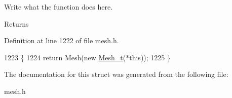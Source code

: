 Write what the function does here. 

\begin{DoxyReturn}{Returns}

\end{DoxyReturn}


Definition at line 1222 of file mesh.\+h.


\begin{DoxyCode}
1223 \{
1224     \textcolor{keywordflow}{return} Mesh(\textcolor{keyword}{new} \hyperlink{classMesh__t}{Mesh\_t}(*\textcolor{keyword}{this}));
1225 \}
\end{DoxyCode}


The documentation for this struct was generated from the following file\+:\begin{DoxyCompactItemize}
\item 
mesh.\+h\end{DoxyCompactItemize}
